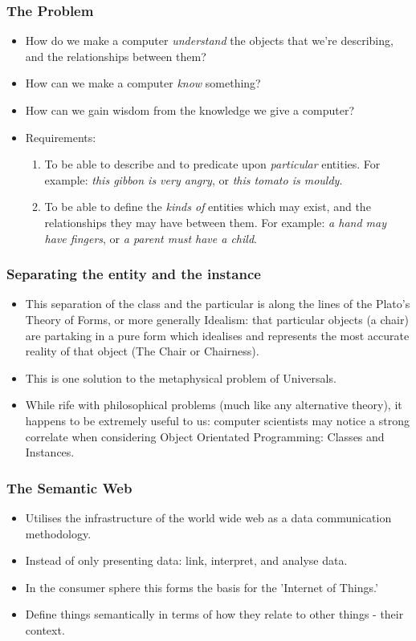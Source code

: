 \documentclass[aspectratio=169]{beamer} %
\begin{document}
\begin{frame}
\frametitle{The Problem}

\begin{itemize}
  \item How do we make a computer \emph{understand} the objects that we're describing,
  and the relationships between them?
  \item How can we make a computer \emph{know} something?
  \item How can we gain wisdom from the knowledge we give a computer?
  \item Requirements:
  \begin{enumerate}
    \item To be able to describe and to predicate upon \emph{particular}
    entities. For example: \emph{this gibbon is very angry}, or \emph{this tomato is
    mouldy}.
    \item To be able to define the \emph{kinds of} entities which may exist, and
    the relationships they may have between them. For example: \emph{a hand may have
    fingers}, or \emph{a parent must have a child}.
  \end{enumerate}
\end{itemize}
\end{frame}

\begin{frame}
\frametitle{Separating the entity and the instance}
 \begin{itemize}
  \item This separation of the class and the particular is along the lines of
  the Plato's Theory of Forms, or more generally Idealism: that particular
  objects (a chair) are partaking in a pure form which idealises and represents
  the most accurate reality of that object (The Chair or Chairness).
  \item This is one solution to the metaphysical problem of Universals.
  \item While rife with philosophical problems (much like any alternative
  theory), it happens to be extremely useful to us: computer scientists may
  notice a strong correlate when considering Object Orientated Programming:
  Classes and Instances.
\end{itemize}
\end{frame}

\begin{frame}
\frametitle{The Semantic Web}

\begin{itemize}
  \item Utilises the infrastructure of the world wide web as a data
  communication methodology.
  \item Instead of only presenting data: link, interpret, and analyse data.
  \item In the consumer sphere this forms the basis for the 'Internet of
  Things.' 
  \item Define things semantically in terms of how they relate to other things - their context.
\end{itemize}
\end{frame}
\end{document}

